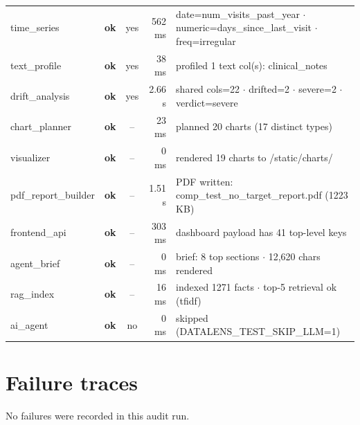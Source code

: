 \documentclass[11pt,a4paper]{article}
\begin{document}
\begin{tabularx}{\linewidth}{l c c r X}
  time\_series & \textcolor{ok}{\textbf{ok}} & \textcolor{ok}{yes} & 562 ms & date=num\_visits\_past\_year $\cdot$ numeric=days\_since\_last\_visit $\cdot$ freq=irregular \\
  text\_profile & \textcolor{ok}{\textbf{ok}} & \textcolor{ok}{yes} & 38 ms & profiled 1 text col(s): clinical\_notes \\
  drift\_analysis & \textcolor{ok}{\textbf{ok}} & \textcolor{ok}{yes} & 2.66 s & shared cols=22 $\cdot$ drifted=2 $\cdot$ severe=2 $\cdot$ verdict=severe \\
  chart\_planner & \textcolor{ok}{\textbf{ok}} & -- & 23 ms & planned 20 charts (17 distinct types) \\
  visualizer & \textcolor{ok}{\textbf{ok}} & -- & 0 ms & rendered 19 charts to /static/charts/ \\
  pdf\_report\_builder & \textcolor{ok}{\textbf{ok}} & -- & 1.51 s & PDF written: comp\_test\_no\_target\_report.pdf (1223 KB) \\
  frontend\_api & \textcolor{ok}{\textbf{ok}} & -- & 303 ms & dashboard payload has 41 top-level keys \\
  agent\_brief & \textcolor{ok}{\textbf{ok}} & -- & 0 ms & brief: 8 top sections $\cdot$ 12,620 chars rendered \\
  rag\_index & \textcolor{ok}{\textbf{ok}} & -- & 16 ms & indexed 1271 facts $\cdot$ top-5 retrieval ok (tfidf) \\
  ai\_agent & \textcolor{ok}{\textbf{ok}} & \textcolor{ink3}{no} & 0 ms & skipped (DATALENS\_TEST\_SKIP\_LLM=1) \\
\bottomrule
\end{tabularx}


\section{Failure traces}
No failures were recorded in this audit run.
\end{document}
